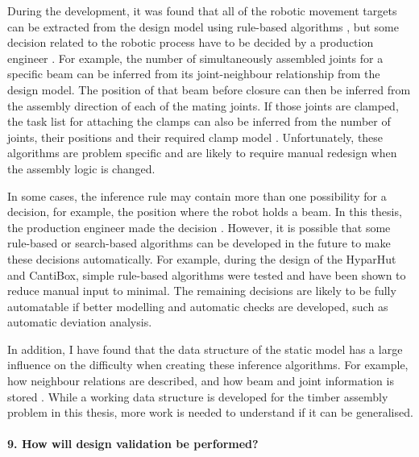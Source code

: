 During the development, it was found that all of the robotic movement targets can be extracted from the design model using rule-based algorithms , but some decision related to the robotic process have to be decided by a production engineer . For example, the number of simultaneously assembled joints for a specific beam can be inferred from its joint-neighbour relationship from the design model. The position of that beam before closure can then be inferred from the assembly direction of each of the mating joints. If those joints are clamped, the task list for attaching the clamps can also be inferred from the number of joints, their positions and their required clamp model . Unfortunately, these algorithms are problem specific and are likely to require manual redesign when the assembly logic is changed. 

In some cases, the inference rule may contain more than one possibility for a decision, for example, the position where the robot holds a beam. In this thesis, the production engineer made the decision . However, it is possible that some rule-based or search-based algorithms can be developed in the future to make these decisions automatically. For example, during the design of the HyparHut and CantiBox, simple rule-based algorithms were tested and have been shown to reduce manual input to minimal. The remaining decisions are likely to be fully automatable if better modelling and automatic checks are developed, such as automatic deviation analysis.

In addition, I have found that the data structure of the static model has a large influence on the difficulty when creating these inference algorithms. For example, how neighbour relations are described, and how beam and joint information is stored . While a working data structure is developed for the timber assembly problem in this thesis, more work is needed to understand if it can be generalised. 

\paragraph{9. How will design validation be performed?}

